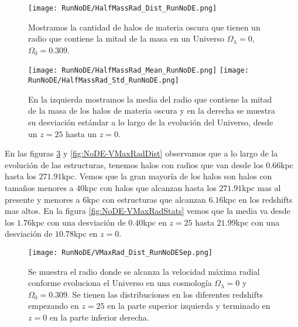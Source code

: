\begin{figure}[H]
    \centering
    \texttt{[image: RunNoDE/HalfMassRad\_Dist\_RunNoDE.png]}
    \caption[Distribución del radio que contiene la mitad de la masa en un Universo $\Omega_\lambda = 0$, $\Omega_0 = 0.309$]{\footnotesize Mostramos la cantidad de halos de materia oscura que tienen un radio que contiene la mitad de la masa en un Universo $\Omega_\lambda = 0$, $\Omega_0 = 0.309$.}
    \label{fig:NoDE-HalfMassRadDist}
\end{figure}

\begin{figure}[H]
    \centering
    \texttt{[image: RunNoDE/HalfMassRad\_Mean\_RunNoDE.png]}
    \texttt{[image: RunNoDE/HalfMassRad\_Std\_RunNoDE.png]}
    \caption[Media y desviación estándar del radio de la mitad de la masa de un Universo $\Omega_\lambda = 0$, $\Omega_0 = 0.309$]{\footnotesize En la izquierda mostramos la media del radio que contiene la mitad de la masa de los halos de materia oscura y en la derecha se muestra su desviación estándar a lo largo de la evolución del Universo, desde un $z=25$ hasta un $z=0$.}
    \label{fig:NoDE-HalfMassRadStats}
\end{figure}

En las figuras \ref{fig:NoDE-VMaxRadDistSep} y \ref{fig:NoDE-VMaxRadDist} observamos que a lo largo de la evolución de las estructuras, tenemos halos con radios que van desde los $0.66$kpc hasta los $271.91$kpc. Vemos que la gran mayoría de los halos son halos con tamaños menores a $40$kpc con halos que alcanzan hasta los $271.91$kpc mas al presente y menores a $6$kpc con estructuras que alcanzan $6.16$kpc en los redshifts mas altos. En la figura \ref{fig:NoDE-VMaxRadStats} vemos que la media va desde los $1.76$kpc con una desviación de $0.40$kpc en $z=25$ hasta $21.99$kpc con una desviación de $10.78$kpc en $z=0$.

\begin{figure}[H]
    \centering
    \texttt{[image: RunNoDE/VMaxRad\_Dist\_RunNoDESep.png]}
    \caption[Radio donde se alcanza la velocidad máxima radial en la evolución de un Universo $\Omega_\lambda = 0$, $\Omega_0 = 0.309$]{\footnotesize Se muestra el radio donde se alcanza la velocidad máxima radial conforme evoluciona el Universo en una cosmología $\Omega_\lambda = 0$ y $\Omega_0 = 0.309$. Se tienen las distribuciones en los diferentes redshifts empezando en $z=25$ en la parte superior izquierda y terminado en $z=0$ en la parte inferior derecha.}
    \label{fig:NoDE-VMaxRadDistSep}
\end{figure}

